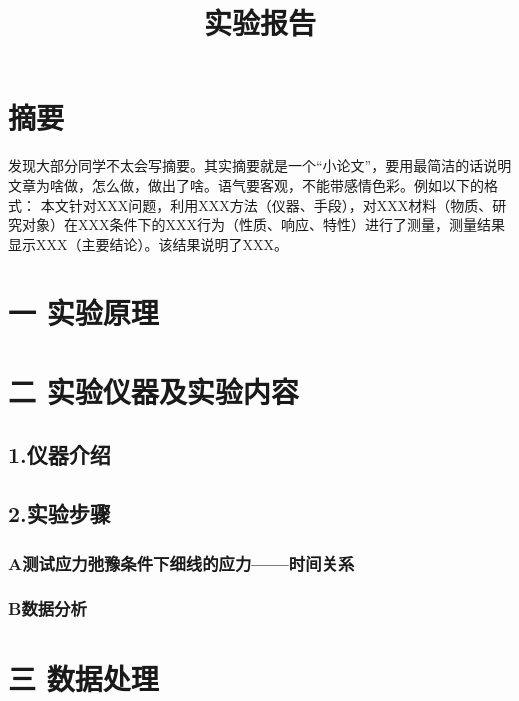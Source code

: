 \documentclass{ctexart}
\title{实验报告}
\begin{document}
\maketitle

\section*{摘要}
发现大部分同学不太会写摘要。其实摘要就是一个“小论文”，要用最简洁的话说明文章为啥做，怎么做，做出了啥。语气要客观，不能带感情色彩。例如以下的格式：
本文针对XXX问题，利用XXX方法（仪器、手段），对XXX材料（物质、研究对象）在XXX条件下的XXX行为（性质、响应、特性）进行了测量，测量结果显示XXX（主要结论）。该结果说明了XXX。

\section*{一 实验原理}




\section*{二 实验仪器及实验内容}
\subsection*{1.\quad 仪器介绍}

\subsection*{2.\quad 实验步骤}
\subsubsection*{A\quad 测试应力弛豫条件下细线的应力——时间关系}



\subsubsection*{B\quad 数据分析}


\section*{三 数据处理}
\end{document}
